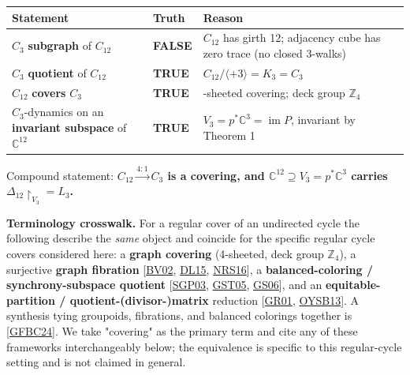 \documentclass[
  11pt,
  a4paper,
]{article}
\newcounter{none} %
\begin{document}
\begingroup\fontsize{9.3}{12}\selectfont\setlength{\tabcolsep}{4pt}\renewcommand{\arraystretch}{1.18}

{\def\LTcaptype{none} %
\begin{longtable}[]{@{}
  >{\raggedright\arraybackslash}p{}
  >{\raggedright\arraybackslash}p{}
  >{\raggedright\arraybackslash}p{}@{}}
\toprule\noalign{}
\begin{minipage}[b]{\linewidth}\raggedright
Statement
\end{minipage} & \begin{minipage}[b]{\linewidth}\raggedright
Truth
\end{minipage} & \begin{minipage}[b]{\linewidth}\raggedright
Reason
\end{minipage} \\
\midrule\noalign{}
\endhead
\bottomrule\noalign{}
\endlastfoot
\(C_3\) \textbf{subgraph} of \(C_{12}\) & \textbf{FALSE} & \(C_{12}\) has girth 12; adjacency cube has zero trace (no closed 3-walks) \\
\(C_3\) \textbf{quotient} of \(C_{12}\) & \textbf{TRUE} & \(C_{12}/\langle+3\rangle=K_3=C_3\) \\
\(C_{12}\) \textbf{covers} \(C_3\) & \textbf{TRUE} & 4-sheeted covering; deck group \(\mathbb Z_4\) \\
\(C_3\)-dynamics on an \textbf{invariant subspace} of \(\mathbb C^{12}\) & \textbf{TRUE} & \(V_3=p^\ast\mathbb C^3=\operatorname{im}P\), invariant by Theorem 1 \\
\end{longtable}
}

\endgroup

Compound statement: \textbf{\(C_{12}\xrightarrow{4:1}C_3\) is a covering, and \(\mathbb C^{12}\supseteq V_3=p^\ast\mathbb C^3\) carries \(\Delta_{12}\!\restriction_{V_3}=L_3\).}

\textbf{Terminology crosswalk.} For a regular cover of an undirected cycle the following describe the \emph{same} object and coincide for the specific regular cycle covers considered here: a \textbf{graph covering} (4-sheeted, deck group \(\mathbb Z_4\)), a surjective \textbf{graph fibration} {[}\hyperlink{ref-BV02}{BV02}, \hyperlink{ref-DL15}{DL15}, \hyperlink{ref-NRS16}{NRS16}{]}, a \textbf{balanced-coloring / synchrony-subspace quotient} {[}\hyperlink{ref-SGP03}{SGP03}, \hyperlink{ref-GST05}{GST05}, \hyperlink{ref-GS06}{GS06}{]}, and an \textbf{equitable-partition / quotient-(divisor-)matrix} reduction {[}\hyperlink{ref-GR01}{GR01}, \hyperlink{ref-OYSB13}{OYSB13}{]}. A synthesis tying groupoids, fibrations, and balanced colorings together is {[}\hyperlink{ref-GFBC24}{GFBC24}{]}. We take "covering" as the primary term and cite any of these frameworks interchangeably below; the equivalence is specific to this regular-cycle setting and is not claimed in general.
\end{document}
